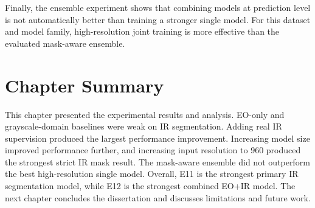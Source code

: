 Finally, the ensemble experiment shows that combining models at prediction level is not automatically better than training a stronger single model. For this dataset and model family, high-resolution joint training is more effective than the evaluated mask-aware ensemble.

\section{Chapter Summary}

This chapter presented the experimental results and analysis. EO-only and grayscale-domain baselines were weak on IR segmentation. Adding real IR supervision produced the largest performance improvement. Increasing model size improved performance further, and increasing input resolution to 960 produced the strongest strict IR mask result. The mask-aware ensemble did not outperform the best high-resolution single model. Overall, E11 is the strongest primary IR segmentation model, while E12 is the strongest combined EO+IR model. The next chapter concludes the dissertation and discusses limitations and future work.
